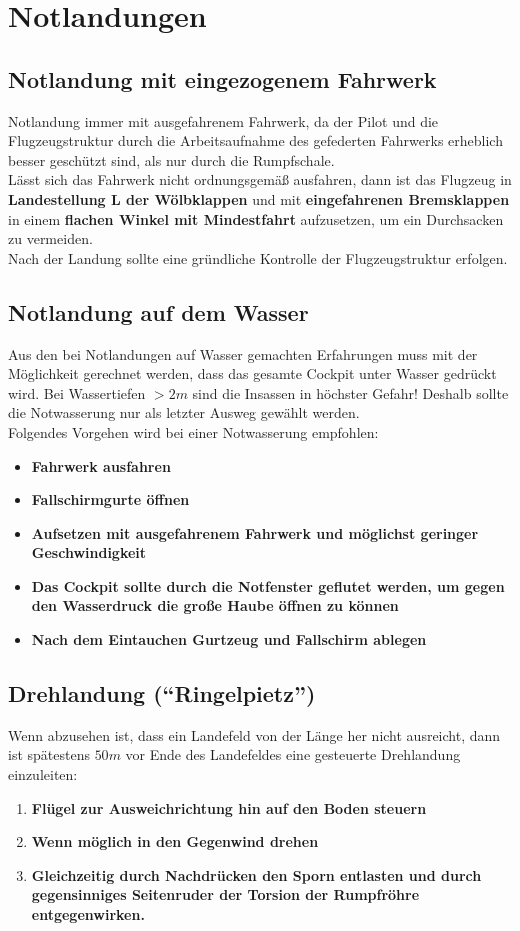\section{Notlandungen}
\subsection{Notlandung mit eingezogenem Fahrwerk}
Notlandung immer mit ausgefahrenem Fahrwerk, da der Pilot und die Flugzeugstruktur durch die Arbeitsaufnahme des gefederten Fahrwerks erheblich besser geschützt sind, als nur durch die Rumpfschale.\\
\newline
Lässt sich das Fahrwerk nicht ordnungsgemäß ausfahren, dann ist das Flugzeug in \textbf{Landestellung L der Wölbklappen} und mit \textbf{eingefahrenen Bremsklappen} in einem \textbf{flachen Winkel mit Mindestfahrt} aufzusetzen, um ein Durchsacken zu vermeiden.\\
Nach der Landung sollte eine gründliche Kontrolle der Flugzeugstruktur erfolgen.

\subsection{Notlandung auf dem Wasser}
Aus den bei Notlandungen auf Wasser gemachten Erfahrungen muss mit der Möglichkeit gerechnet werden, dass das gesamte Cockpit unter Wasser gedrückt wird. Bei Wassertiefen $>2m$ sind die Insassen in höchster Gefahr! Deshalb sollte die Notwasserung nur als letzter Ausweg gewählt werden.\\
\newline
Folgendes Vorgehen wird bei einer Notwasserung empfohlen:
\begin{itemize}
\item \textbf{Fahrwerk ausfahren}
\item \textbf{Fallschirmgurte öffnen}
\item \textbf{Aufsetzen mit ausgefahrenem Fahrwerk und möglichst geringer Geschwindigkeit}
\item \textbf{Das Cockpit sollte durch die Notfenster geflutet werden, um gegen den Wasserdruck die große Haube öffnen zu können}
\item \textbf{Nach dem Eintauchen Gurtzeug und Fallschirm ablegen}
\end{itemize}

\subsection{Drehlandung ("`Ringelpietz"')}
Wenn abzusehen ist, dass ein Landefeld von der Länge her nicht ausreicht, dann ist spätestens $50m$ vor Ende des Landefeldes eine gesteuerte Drehlandung einzuleiten:
\begin{enumerate}
\item \textbf{Flügel zur Ausweichrichtung hin auf den Boden steuern}
\item \textbf{Wenn möglich in den Gegenwind drehen}
\item \textbf{Gleichzeitig durch Nachdrücken den Sporn entlasten und durch gegensinniges Seitenruder der Torsion der Rumpfröhre entgegenwirken.}
\end{enumerate}


